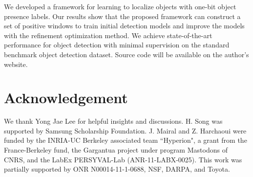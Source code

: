 \documentclass{article}
\begin{document}
We developed a framework for learning to localize objects with one-bit object presence labels. Our results show that the proposed framework can construct a set of positive windows to train initial detection models and improve the models with the refinement optimization method. We achieve state-of-the-art performance for object detection with minimal supervision on the standard benchmark object detection dataset. Source code will be available on the author's website.

\vspace{-5pt}
\section*{Acknowledgement}
\small{
We thank Yong Jae Lee for helpful insights and discussions. H. Song was supported by Samsung Scholarship Foundation. J. Mairal and Z. Harchaoui were funded by the INRIA-UC Berkeley associated team ``Hyperion", a grant from the France-Berkeley fund, the Gargantua project under program Mastodons of CNRS, and the LabEx PERSYVAL-Lab (ANR-11-LABX-0025). This work was partially supported by  ONR N00014-11-1-0688, NSF, DARPA, and Toyota.}



\end{document}
